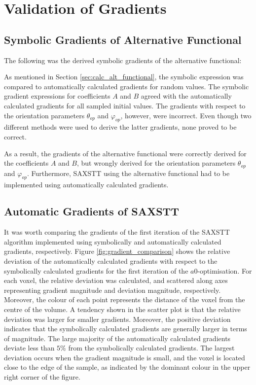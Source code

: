 \chapter{Validation of Gradients}


\section{Symbolic Gradients of Alternative Functional}

The following was the derived symbolic gradients of the alternative functional:


As mentioned in Section \ref{sec:calc_alt_functional}, the symbolic expression was compared to automatically calculated gradients for random values.
The symbolic gradient expressions for coefficients $A$ and $B$ agreed with the automatically calculated gradients for all sampled initial values.
The gradients with respect to the orientation parameters $\theta_{op}$ and $\varphi_{op}$, however, were incorrect.
Even though two different methods were used to derive the latter gradients, none proved to be correct.

As a result, the gradients of the alternative functional were correctly derived for the coefficients $A$ and $B$,
but wrongly derived for the orientation parameters $\theta_{op}$ and $\varphi_{op}$.
Furthermore, SAXSTT using the alternative functional had to be implemented using automatically calculated gradients.

\section{Automatic Gradients of SAXSTT}

It was worth comparing the gradients of the first iteration of the SAXSTT algorithm implemented using symbolically and automatically calculated gradients, respectively.
Figure \ref{fig:gradient_comparison} shows
the relative deviation of the automatically calculated gradients with respect to the symbolically calculated gradients for the first iteration of the $a0$-optimisation.
For each voxel, the relative deviation was calculated, and scattered along axes representing gradient magnitude and deviation magnitude, respectively.
Moreover, the colour of each point represents the distance of the voxel from the centre of the volume.
A tendency shown in the scatter plot is that the relative deviation was larger for smaller gradients.
Moreover, the positive deviation indicates that the symbolically calculated gradients are generally larger in terms of magnitude.
The large majority of the automatically calculated gradients deviate less than $5\%$ from the symbolically calculated gradients.
The largest deviation occurs when the gradient magnitude is small, and the voxel is located close to the edge of the sample,
as indicated by the dominant colour in the upper right corner of the figure.

